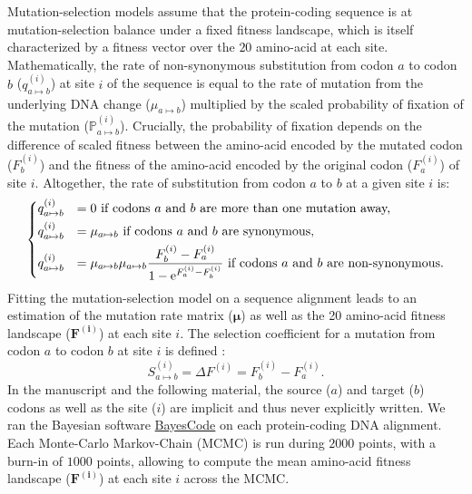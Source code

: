 \documentclass{article}
\newcommand{\UniDimArray}[1]{\bm{#1}}
\newcommand{\e}{\mathrm{e}}
\newcommand{\proba}{\mathbb{P}}
\begin{document}
    Mutation-selection models assume that the protein-coding sequence is at mutation-selection balance under a fixed fitness landscape, which is itself characterized by a fitness vector over the $20$ amino-acid at each site\cite{yang_mutationselection_2008, halpern_evolutionary_1998, rodrigue_mechanistic_2010}.
    Mathematically, the rate of non-synonymous substitution from codon $a$ to codon $b$ ($q_{a \mapsto b}^{(i)}$) at site $i$ of the sequence is equal to the rate of mutation from the underlying DNA change ($\mu_{a \mapsto b}$) multiplied by the scaled probability of fixation of the mutation ($\proba_{a \mapsto b}^{(i)}$).
    Crucially, the probability of fixation depends on the difference of scaled fitness between the amino-acid encoded by the mutated codon ($F_b^{(i)}$) and the fitness of the amino-acid encoded by the original codon ($F_a^{(i)}$) of site $i$\cite{wright_evolution_1931, fisher_genetical_1930}.
    Altogether, the rate of substitution from codon $a$ to $b$ at a given site $i$ is:
    \begin{equation}
        \begin{dcases}
            q_{a \mapsto b}^{(i)} & = 0 \text{ if codons $a$ and $b$ are more than one mutation away,} \\
            q_{a \mapsto b}^{(i)} & = \mu_{a \mapsto b} \text{ if codons $a$ and $b$ are synonymous,} \\
            q_{a \mapsto b}^{(i)} & = \mu_{a \mapsto b}  \mu_{a \mapsto b} \dfrac{F_b^{(i)} - F_a^{(i)}}{1 - \e^{F_a^{(i)} - F_b^{(i)}}} \text{ if codons $a$ and $b$ are non-synonymous}.
        \end{dcases}
    \end{equation}
    Fitting the mutation-selection model on a sequence alignment leads to an estimation of the mutation rate matrix ($\UniDimArray{\mu}$) as well as the 20 amino-acid fitness landscape ($\UniDimArray{F^{(i)}}$) at each site $i$.
    The selection coefficient for a mutation from codon $a$ to codon $b$ at site $i$ is defined :
    \begin{equation}
        S_{a \mapsto b}^{(i)} = \Delta F^{(i)} = F^{(i)}_{b} - F^{(i)}_{a}.
    \end{equation}
    In the manuscript and the following material, the source ($a$) and target ($b$) codons as well as the site ($i$) are implicit and thus never explicitly written.
    We ran the Bayesian software \href{https://github.com/bayesiancook/bayescode}{BayesCode} on each protein-coding DNA alignment\cite{lartillot_phylobayes_2013, rodrigue_detecting_2017, rodrigue_bayesian_2021}.
    Each Monte-Carlo Markov-Chain (MCMC) is run during $2000$ points, with a burn-in of $1000$ points, allowing to compute the mean amino-acid fitness landscape ($\UniDimArray{F^{(i)}}$) at each site $i$ across the MCMC\@.
\end{document}
